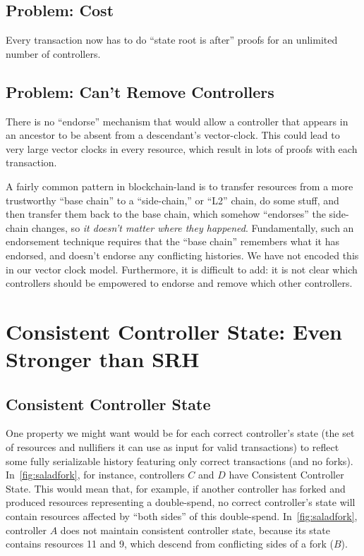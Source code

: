 \documentclass[a4paper,USenglish,cleveref, autoref, thm-restate, anonymous]{lipics-v2021}
\begin{document}
\subsection{Problem: Cost}
Every transaction now has to do ``state root is after'' proofs for an unlimited number of controllers.

\subsection{Problem: Can't Remove Controllers}
There is no ``endorse'' mechanism that would allow a controller that appears in an ancestor to be absent from a descendant's vector-clock. 
This could lead to very large vector clocks in every resource, which result in lots of proofs with each transaction.

A fairly common pattern in blockchain-land is to transfer resources from a more trustworthy ``base chain'' to a ``side-chain,'' or ``L2'' chain, do some stuff, and then transfer them back to the base chain, which somehow ``endorses'' the side-chain changes, so \textit{it doesn't matter where they happened}. 
Fundamentally, such an endorsement technique requires that the ``base chain'' remembers what it has endorsed, and doesn't endorse any conflicting histories. 
We have not encoded this in our vector clock model.
Furthermore, it is difficult to add: it is not clear which controllers should be empowered to endorse and remove which other controllers. 




\section{Consistent Controller State: Even Stronger than SRH}
\label{sec:consistentcontrollerstate}
\subsection{Consistent Controller State}
One property we might want would be for each correct controller's state (the set of resources and nullifiers it can use as input for valid transactions) to reflect some fully serializable history featuring only correct transactions (and no forks). 
In~\cref{fig:saladfork}, for instance, controllers $C$ and $D$ have Consistent Controller State.
This would mean that, for example, if another controller has forked and produced resources representing a double-spend, no correct controller's state will contain resources affected by ``both sides'' of this double-spend.
In~\cref{fig:saladfork}, controller $A$ does not maintain consistent controller state, because its state contains resources 11 and 9, which descend from conflicting sides of a fork ($B$).
\end{document}
